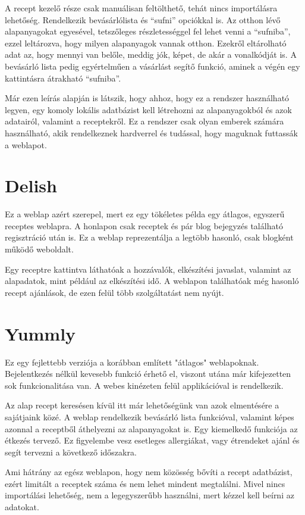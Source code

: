 \documentclass[12pt]{report}
\theoremstyle{definition}
\begin{document}
A recept kezelő része csak manuálisan feltölthető, tehát nincs importálásra lehetőség. Rendelkezik bevásárlólista és “sufni” opciókkal is. Az otthon lévő alapanyagokat egyesével, tetszőleges részletességgel fel lehet venni a “sufniba”, ezzel leltározva, hogy milyen alapanyagok vannak otthon. Ezekről eltárolható adat az, hogy mennyi van belőle, meddig jók, képet, de akár a vonalkódját is. A bevásárló lista pedig egyértelműen a vásárlást segítő funkció, aminek a végén egy kattintásra átrakható “sufniba”.

Már ezen leírás alapján is látszik, hogy ahhoz, hogy ez a rendszer használható legyen, egy komoly lokális adatbázist kell létrehozni az alapanyagokból és azok adatairól, valamint a receptekről. Ez a rendszer csak olyan emberek számára használható, akik rendelkeznek hardverrel és tudással, hogy maguknak futtassák a weblapot.
 

\section{Delish}
Ez a weblap azért szerepel, mert ez egy tökéletes példa egy átlagos, egyszerű receptes weblapra.  A honlapon csak receptek és pár blog bejegyzés található regisztráció után is. Ez a weblap reprezentálja a legtöbb hasonló, csak blogként működő weboldalt.

Egy receptre kattintva láthatóak a hozzávalók, elkészítési javaslat, valamint az alapadatok, mint például az elkészítési idő. A weblapon találhatóak még hasonló recept ajánlások, de ezen felül több szolgáltatást nem nyújt.


\section{Yummly}
Ez egy fejlettebb verziója a korábban említett "átlagos" weblapoknak. Bejelentkezés nélkül kevesebb funkció érhető el, viszont utána már kifejezetten sok funkcionalitása van. A webes kinézeten felül applikációval is rendelkezik. 

Az alap recept keresésen kívül itt már lehetőségünk van azok elmentésére a sajátjaink közé. A weblap rendelkezik bevásárló lista funkcióval, valamint képes azonnal a receptből áthelyezni az alapanyagokat is. Egy kiemelkedő funkciója az étkezés tervező. Ez figyelembe vesz esetleges allergiákat, vagy étrendeket ajánl és segít tervezni a következő időszakra. 

Ami hátrány az egész weblapon, hogy nem közösség bővíti a recept adatbázist, ezért limitált a receptek száma és nem lehet mindent megtalálni. Mivel nincs importálási lehetőség, nem a legegyszerűbb használni, mert kézzel kell beírni az adatokat.
\end{document}
